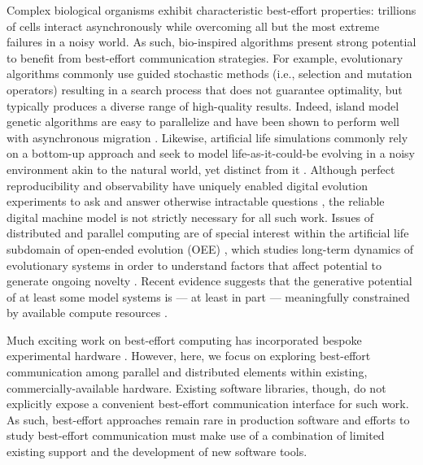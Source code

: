 Complex biological organisms exhibit characteristic best-effort properties: trillions of cells interact asynchronously while overcoming all but the most extreme failures in a noisy world.
As such, bio-inspired algorithms present strong potential to benefit from best-effort communication strategies.
For example, evolutionary algorithms commonly use guided stochastic methods (i.e., selection and mutation operators) resulting in a search process that does not guarantee optimality, but typically produces a diverse range of high-quality results.
Indeed, island model genetic algorithms are easy to parallelize and have been shown to perform well with asynchronous migration \citep{izzo2009parallel}.
Likewise, artificial life simulations commonly rely on a bottom-up approach and seek to model life-as-it-could-be evolving in a noisy environment akin to the natural world, yet distinct from it \citep{bonabeau1994we}. %
Although perfect reproducibility and observability have uniquely enabled digital evolution experiments to ask and answer otherwise intractable questions \citep{pontes2020evolutionary,lenski2003evolutionary,grabowski2013case,dolson2020interpreting,fortuna2019coevolutionary,goldsby2014evolutionary,covert2013experiments,zaman2011rapid,bundy2021footprint,dolson2017spatial}, the reliable digital machine model is not strictly necessary for all such work.
Issues of distributed and parallel computing are of special interest within the artificial life subdomain of open-ended evolution (OEE) \citep{ackley2014indefinitely}, which studies long-term dynamics of evolutionary systems in order to understand factors that affect potential to generate ongoing novelty \citep{taylor2016open}.
Recent evidence suggests that the generative potential of at least some model systems is --- at least in part --- meaningfully constrained by available compute resources \citep{channon2019maximum}.

Much exciting work on best-effort computing has incorporated bespoke experimental hardware \citep{chippa2014scalable, ackley2011homeostatic, cho2012ersa, chakrapani2008probabilistic, rhodes2020real}.
However, here, we focus on exploring best-effort communication among parallel and distributed elements within existing, commercially-available hardware.
Existing software libraries, though, do not explicitly expose a convenient best-effort communication interface for such work.
As such, best-effort approaches remain rare in production software and efforts to study best-effort communication must make use of a combination of limited existing support and the development of new software tools.

